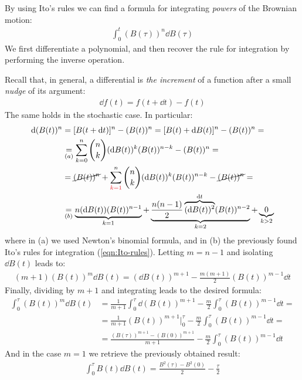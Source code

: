 \documentclass[../template.tex]{subfiles}
\begin{document}
\begin{example}
    By using Ito's rules we can find a formula for integrating \textit{powers} of the Brownian motion:
    \begin{align*}
        \int_0^t (B(\tau))^n \dd{B(\tau)}
    \end{align*} 
    We first differentiate a polynomial, and then recover the rule for integration by performing the inverse operation.

    Recall that, in general, a differential is \textit{the increment} of a function after a small \textit{nudge} of its argument:  
    \begin{align*}
        \dd{f(t)} = f(t+\dd{t}) - f(t)
    \end{align*}
    The same holds in the stochastic case. In particular:
    \begin{align*}
        \dd{(B(t))^n} &= [B(t+\dd{t})]^n - (B(t))^n =[B(t) + \dd{B(t)}]^n - (B(t))^n = \\
        &\underset{(a)}{=} \sum_{k=0}^{n} {n\choose k} (\dd{B(t)})^k (B(t))^{n-k}- (B(t))^n = \\
        &= \cancel{(B(t))^n} + \sum_{\textcolor{Red}{k=1}}^n {n\choose k} (\dd{B(t)})^k (B(t))^{n-k} - \cancel{(B(t))^n} = \\
        &\underset{(b)}{=}  \underbrace{n(\dd{B(t)}) (B(t))^{n-1}}_{k = 1}  + \underbrace{\frac{n(n-1)}{2} \overbrace{(\dd{B(t)})^2}^{\dd{t}}  (B(t))^{n-2}}_{k = 2}  + \underbrace{0}_{k > 2}   
    \end{align*}
    where in (a) we used Newton's binomial formula, and in (b) the previously found Ito's rules for integration (\ref{eqn:Ito-rules}). Letting $m = n-1$ and isolating $\dd{B(t)}$ leads to:
    \begin{align*}
        (m+1) (B(t))^m \dd{B(t)} = (\dd{B(t)})^{m+1} - \frac{m(m+1)}{2} (B(t))^{m-1} \dd{t} 
    \end{align*}
    Finally, dividing by $m+1$ and integrating leads to the desired formula:
    \begin{align*}
        \int_0^\tau (B(t))^m \dd{B(t)} &= \frac{1}{m+1}\int_0^\tau \dd{(B(t))}^{m+1} - \frac{m}{2} \int_0^\tau (B(t))^{m-1} \dd{t} =\\
        &=  \frac{1}{m+1} (B(t))^{m+1}\Big|_{0}^{\tau} - \frac{m}{2} \int_0^\tau (B(t))^{m-1} \dd{t} =\\
        &= \frac{(B(\tau))^{m+1} - (B(0))^{m+1}}{m+1} - \frac{m}{2} \int_0^\tau (B(t))^{m-1} \dd{t}    
    \end{align*}
    And in the case $m=1$ we retrieve the previously obtained result:
    \begin{align*}
        \int_0^\tau B(t) \dd{B(t)} = \frac{B^2(\tau) - B^2(0)}{2} - \frac{\tau}{2}   
    \end{align*}
\end{example}
\end{document}
